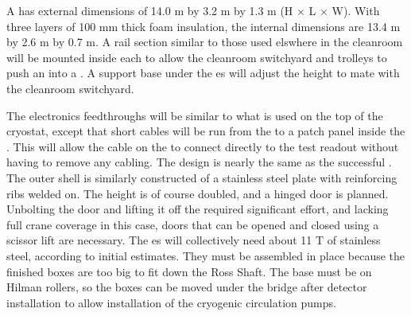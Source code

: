A \coldbox has external dimensions of 14.0 \si{m} by 3.2 \si{m} by 1.3 \si{m} (H $\times$ L $\times$ W). With three layers of 100 \si{mm} thick foam insulation,  
the internal dimensions are 13.4 \si{m} by 2.6 \si{m} by 0.7 \si{m}. A rail section similar to those used elswhere in the cleanroom will be mounted inside each \coldbox to allow the cleanroom switchyard and trolleys to push an    into a \coldbox. A support base under the \coldbox{}es will adjust the height to mate with the cleanroom switchyard.

 
The \coldbox electronics feedthroughs will be  similar to what is used on the top of the  cryostat, except that short cables will be run from the   to a patch panel inside the \coldbox. This will allow the cable on the  to connect directly to the test readout without having to remove any cabling. The \coldbox  design is nearly the same as the successful  \coldbox. The outer shell is similarly constructed of a stainless steel plate with reinforcing ribs welded on. The height is of course doubled, and a hinged door is planned. Unbolting the door and lifting it off the  \coldbox required significant effort, and lacking full crane coverage in this case, doors that can be opened and closed using a scissor lift are necessary. The  \coldbox{}es will collectively need about 11 \si{T} of stainless steel, according to initial estimates. They must be assembled in place because the finished boxes are too big to fit down the Ross Shaft. The \coldbox base must be on Hilman rollers, so the boxes can be moved under the bridge after detector installation  to allow installation of the cryogenic circulation pumps.




